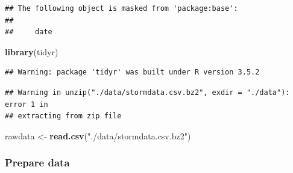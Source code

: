\documentclass[]{article}
\newenvironment{Shaded}{\begin{snugshade}}{\end{snugshade}}
\newcommand{\KeywordTok}[1]{\textcolor[rgb]{0.13,0.29,0.53}{\textbf{#1}}}
\newcommand{\DataTypeTok}[1]{\textcolor[rgb]{0.13,0.29,0.53}{#1}}
\newcommand{\StringTok}[1]{\textcolor[rgb]{0.31,0.60,0.02}{#1}}
\newcommand{\ControlFlowTok}[1]{\textcolor[rgb]{0.13,0.29,0.53}{\textbf{#1}}}
\newcommand{\OperatorTok}[1]{\textcolor[rgb]{0.81,0.36,0.00}{\textbf{#1}}}
\newcommand{\NormalTok}[1]{#1}
\begin{document}
\begin{verbatim}
## The following object is masked from 'package:base':
## 
##     date
\end{verbatim}

\begin{Shaded}
\begin{Highlighting}[]
\KeywordTok{library}\NormalTok{(tidyr)}
\end{Highlighting}
\end{Shaded}

\begin{verbatim}
## Warning: package 'tidyr' was built under R version 3.5.2
\end{verbatim}

\begin{Shaded}
\end{Shaded}

\begin{verbatim}
## Warning in unzip("./data/stormdata.csv.bz2", exdir = "./data"): error 1 in
## extracting from zip file
\end{verbatim}

\begin{Shaded}
\begin{Highlighting}[]
\NormalTok{rawdata <-}\StringTok{ }\KeywordTok{read.csv}\NormalTok{(}\StringTok{"./data/stormdata.csv.bz2"}\NormalTok{)}
\end{Highlighting}
\end{Shaded}

\subsubsection{Prepare data}\label{prepare-data}
\end{document}
